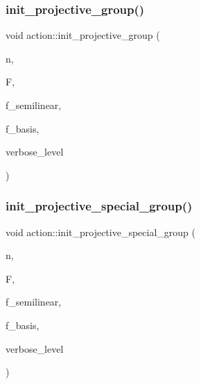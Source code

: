\subsubsection{\texorpdfstring{init\+\_\+projective\+\_\+group()}{init\_projective\_group()}}
{\footnotesize\ttfamily void action\+::init\+\_\+projective\+\_\+group (\begin{DoxyParamCaption}\item[{\mbox{\hyperlink{galois_8h_a09fddde158a3a20bd2dcadb609de11dc}{I\+NT}}}]{n,  }\item[{\mbox{\hyperlink{classfinite__field}{finite\+\_\+field}} $\ast$}]{F,  }\item[{\mbox{\hyperlink{galois_8h_a09fddde158a3a20bd2dcadb609de11dc}{I\+NT}}}]{f\+\_\+semilinear,  }\item[{\mbox{\hyperlink{galois_8h_a09fddde158a3a20bd2dcadb609de11dc}{I\+NT}}}]{f\+\_\+basis,  }\item[{\mbox{\hyperlink{galois_8h_a09fddde158a3a20bd2dcadb609de11dc}{I\+NT}}}]{verbose\+\_\+level }\end{DoxyParamCaption})}

\mbox{\label{classaction_a4c69f0e07dff8ba8ac2415faf69d55a4}} 
\subsubsection{\texorpdfstring{init\+\_\+projective\+\_\+special\+\_\+group()}{init\_projective\_special\_group()}}
{\footnotesize\ttfamily void action\+::init\+\_\+projective\+\_\+special\+\_\+group (\begin{DoxyParamCaption}\item[{\mbox{\hyperlink{galois_8h_a09fddde158a3a20bd2dcadb609de11dc}{I\+NT}}}]{n,  }\item[{\mbox{\hyperlink{classfinite__field}{finite\+\_\+field}} $\ast$}]{F,  }\item[{\mbox{\hyperlink{galois_8h_a09fddde158a3a20bd2dcadb609de11dc}{I\+NT}}}]{f\+\_\+semilinear,  }\item[{\mbox{\hyperlink{galois_8h_a09fddde158a3a20bd2dcadb609de11dc}{I\+NT}}}]{f\+\_\+basis,  }\item[{\mbox{\hyperlink{galois_8h_a09fddde158a3a20bd2dcadb609de11dc}{I\+NT}}}]{verbose\+\_\+level }\end{DoxyParamCaption})}

